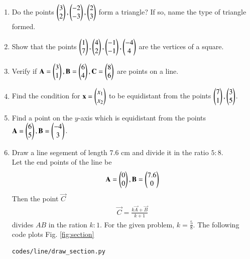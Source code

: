 \renewcommand{\theequation}{\theenumi}
\begin{enumerate}[label=\arabic*.,ref=\thesubsection.\theenumi]

\item Do the points $\begin{pmatrix}3\\2\end{pmatrix}, \begin{pmatrix}-2\\-3\end{pmatrix}, \begin{pmatrix}2\\3\end{pmatrix} $ form a triangle?  If so, name the type of triangle formed.

\item Show that the points $\begin{pmatrix}1\\7\end{pmatrix}, \begin{pmatrix}4\\2\end{pmatrix}, \begin{pmatrix}-1\\-1\end{pmatrix}, \begin{pmatrix}-4\\4\end{pmatrix} $  are the vertices of a square.
\item Verify if $\mathbf{A} = \begin{pmatrix}3\\1\end{pmatrix}, \mathbf{B} = \begin{pmatrix}6\\4\end{pmatrix}, \mathbf{C} = \begin{pmatrix}8\\6\end{pmatrix}$ are points on a line.
\item Find the condition for $\mathbf{x} = \begin{pmatrix}x_1\\x_2\end{pmatrix}$ to be equidistant from the points $\begin{pmatrix}7\\1\end{pmatrix}, \begin{pmatrix}3\\5\end{pmatrix}$.
\item Find a point on the $y$-axis which is equidistant from the points $\mathbf{A} = \begin{pmatrix}6\\5\end{pmatrix}, \mathbf{B} = \begin{pmatrix}-4\\3\end{pmatrix}$.
\item Draw a line segement of length 7.6 cm and divide it in the ratio $5:8$.
\\
\solution Let the end points of the line be 
\begin{align}
\mathbf{A} = \begin{pmatrix}0\\0\end{pmatrix}, \mathbf{B} = \begin{pmatrix}7.6\\0\end{pmatrix}
\end{align}
Then the point $\vec{C}$
\begin{align}
\vec{C} = \frac{k \vec{A} + \vec{B}}{k+1}
\end{align}
divides $AB$ in the ration $k:1$. For the given problem, $k = \frac{5}{8}$.
The following code plots Fig. \ref{fig:section}
\begin{lstlisting}
codes/line/draw_section.py
\end{lstlisting}
\begin{figure}[!ht]

\end{figure}
\end{enumerate}
